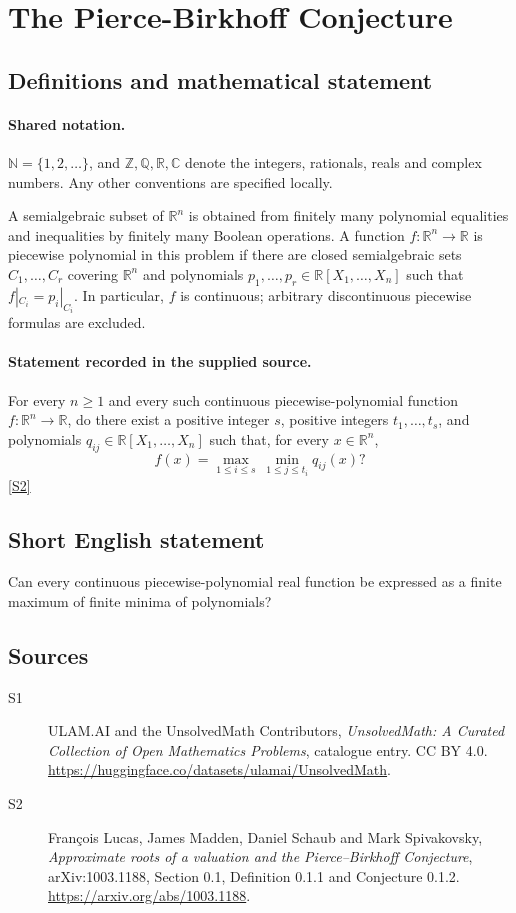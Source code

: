 \documentclass[11pt]{article}
\newcommand{\sref}[2]{\hyperlink{source:#1:#2}{[S#2]}}
\begin{document}
\section{The Pierce-Birkhoff Conjecture}\label{statement}

\subsection{Definitions and mathematical statement}

\paragraph{Shared notation.}$\mathbb N=\{1,2,\ldots\}$, and $\mathbb Z,\mathbb Q,\mathbb R,\mathbb C$ denote the integers, rationals, reals and complex numbers. Any other conventions are specified locally.


A semialgebraic subset of \(\mathbb R^n\) is obtained from finitely
many polynomial equalities and inequalities by finitely many Boolean
operations.  A function \(f:\mathbb R^n\to\mathbb R\) is piecewise
polynomial in this problem if there are closed semialgebraic sets
\(C_1,\ldots,C_r\) covering \(\mathbb R^n\) and polynomials
\(p_1,\ldots,p_r\in\mathbb R[X_1,\ldots,X_n]\) such that
\(f|_{C_i}=p_i|_{C_i}\).  In particular, \(f\) is continuous;
arbitrary discontinuous piecewise formulas are excluded.
\paragraph{Statement recorded in the supplied source.}
For every \(n\ge1\) and every such continuous piecewise-polynomial
function \(f:\mathbb R^n\to\mathbb R\), do there exist a positive
integer \(s\), positive integers \(t_1,\ldots,t_s\), and polynomials
\(q_{ij}\in\mathbb R[X_1,\ldots,X_n]\) such that, for every
\(x\in\mathbb R^n\),
\[
 f(x)=\max_{1\le i\le s}\ \min_{1\le j\le t_i}q_{ij}(x)?
\] \sref{statement}{2}
\subsection{Short English statement}
Can every continuous piecewise-polynomial real function be expressed as a finite maximum of finite minima of polynomials?
\subsection{Sources}
\begin{description}
\item[\hypertarget{source:statement:1}{S1}] ULAM.AI and the UnsolvedMath Contributors, \emph{UnsolvedMath: A Curated Collection of Open Mathematics Problems}, catalogue entry. CC BY 4.0. \url{https://huggingface.co/datasets/ulamai/UnsolvedMath}.
\item[\hypertarget{source:statement:2}{S2}] Fran\c{c}ois Lucas, James Madden, Daniel Schaub and Mark Spivakovsky, \emph{Approximate roots of a valuation and the Pierce--Birkhoff Conjecture}, arXiv:1003.1188, Section 0.1, Definition 0.1.1 and Conjecture 0.1.2. \url{https://arxiv.org/abs/1003.1188}.
\end{description}
\label{end:statement}
\end{document}
